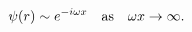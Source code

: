 \begin{equation} \label{bd-infty}
\psi(r) \sim e^{-i \omega x} \textrm{\quad as\quad} \omega x \to \infty.
\end{equation}

